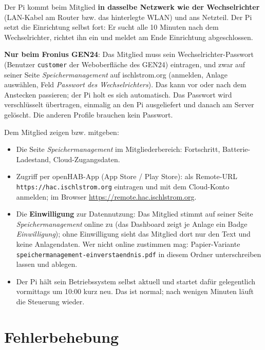 \documentclass[a4paper,11pt]{article}
\newcommand{\phase}[1]{\textsf{\small #1}}
\begin{document}
Der Pi kommt beim Mitglied \textbf{in dasselbe Netzwerk wie der
Wechselrichter} (LAN-Kabel am Router bzw. das hinterlegte WLAN) und ans
Netzteil. Der Pi setzt die Einrichtung selbst fort: Er sucht alle
10 Minuten nach dem Wechselrichter, richtet ihn ein und meldet am Ende
\phase{Einrichtung abgeschlossen}.

\textbf{Nur beim Fronius GEN24}: Das Mitglied muss sein
Wechselrichter-Passwort (Benutzer \texttt{customer} der
Weboberfläche des GEN24) eintragen, und zwar auf seiner Seite
\emph{Speichermanagement} auf ischlstrom.org (anmelden, Anlage
auswählen, Feld \emph{Passwort des Wechselrichters}). Das kann vor oder
nach dem Anstecken passieren; der Pi holt es sich automatisch. Das
Passwort wird verschlüsselt übertragen, einmalig an den Pi ausgeliefert
und danach am Server gelöscht. Die anderen Profile brauchen kein
Passwort.

Dem Mitglied zeigen bzw. mitgeben:

\begin{itemize}[nosep]
    \item Die Seite \emph{Speichermanagement} im Mitgliederbereich:
          Fortschritt, Batterie-Ladestand, Cloud-Zugangsdaten.
    \item Zugriff per openHAB-App (App Store / Play Store): als
          Remote-URL \texttt{https://hac.ischlstrom.org} eintragen und
          mit dem Cloud-Konto anmelden; im Browser
          \url{https://remote.hac.ischlstrom.org}.
    \item Die \textbf{Einwilligung} zur Datennutzung: Das Mitglied stimmt
          auf seiner Seite \emph{Speichermanagement} online zu (das
          Dashboard zeigt je Anlage ein Badge \emph{Einwilligung}); ohne
          Einwilligung sieht das Mitglied dort nur den Text und keine
          Anlagendaten. Wer nicht online zustimmen mag: Papier-Variante
          \texttt{speichermanagement-einverstaendnis.pdf} in diesem
          Ordner unterschreiben lassen und ablegen.
    \item Der Pi hält sein Betriebssystem selbst aktuell und startet
          dafür gelegentlich vormittags um 10:00 kurz neu. Das ist normal;
          nach wenigen Minuten läuft die Steuerung wieder.
\end{itemize}

\section{Fehlerbehebung}
\end{document}
